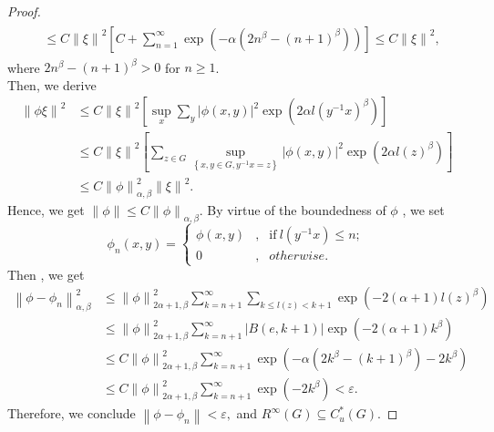 \documentclass[preprint,11pt]{elsarticle}
\numberwithin{equation}{section}
\begin{document}
\begin{proof}
\begin{align*}
\begin{split}
				&\le C\left \| \xi  \right \|^{2}[
				C+\sum _{n=1}^{\infty} \exp(-\alpha(2n^{\beta}-(n+1)^{\beta}))]\le C  \left \| \xi  \right \| ^{2},
			\end{split}
		\end{align*}
		where $2n^{\beta}-(n+1)^{\beta}>0$  for $n\ge 1$.\\
		Then, we derive 
		\begin{align*}
			\left \| \phi \xi  \right \|^{2}  	&\le C\left \| \xi  \right \|^{2}[\sup _{x} \sum_{y}\left |\phi (x,y) \right | ^{2}\exp(2\alpha l(y^{-1}x)^{\beta })]\\
			&\le C\left \| \xi  \right \|^{2} [\sum_{z\in G} \sup_{\left \{ x,y\in G,y^{-1}x=z \right \} }\left |\phi (x,y) \right | ^{2}\exp(2\alpha l(z)^{\beta })]\\
			&\le C \left \| \phi  \right \| _{\alpha ,\beta }^{2} \left \| \xi  \right \| ^{2}.
		\end{align*}
		Hence, we get $\left \| \phi   \right \| \le  C \left \| \phi  \right \| _{\alpha ,\beta }$. 
		By virtue of the boundedness of $\phi$
		, we set 
		\begin{equation*}
			\phi _{n}(x,y)=\left\{
			\begin{aligned}
				\phi(x,y) & , & \text {if}~ l(y^{-1}x)\le n;\\
				0 & , & otherwise.
			\end{aligned}
			\right.
		\end{equation*}
		Then , we get 
		\begin{align*}
			\left \| \phi -\phi_{n} \right \| _{\alpha,\beta }^{2}
			&\le\left \| \phi  \right \| _{2\alpha+1,\beta}^{2}\sum_{k=n+1}^{\infty } \sum _{k\le l(z)<k+1}\exp(-2(\alpha+1) l(z)^{\beta })\\
			&\le\left \| \phi  \right \| _{2\alpha+1,\beta}^{2}
			\sum_{k=n+1}^{\infty }  \left | B(e,k+1) \right |  \exp(-2(\alpha+1) k^{\beta })\\
			&\le C\left \| \phi  \right \| _{2\alpha+1,\beta}^{2}\sum_{k=n+1}^{\infty } \exp(-\alpha(2k^{\beta}-(k+1)^{\beta})-2k^{\beta})\\
			&\le C\left \| \phi  \right \| _{2\alpha+1,\beta}^{2}\sum_{k=n+1}^{\infty } \exp(-2k^{\beta })<\varepsilon.
		\end{align*}
		Therefore, we conclude
		$\left \| \phi -\phi_{n} \right \|<\varepsilon,$ and $R^{\infty }(G)\subseteq C_{u}^{*}(G)$.
	\end{proof}
\end{document}
